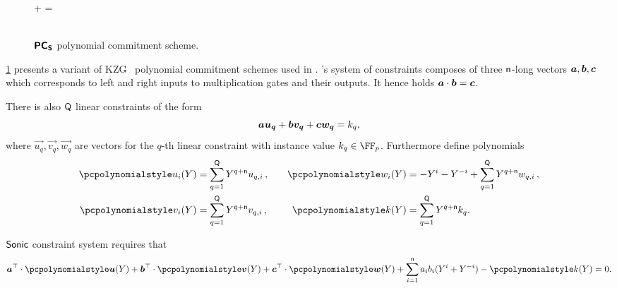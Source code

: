 \begin{figure}[h!]
\begin{pcvstack}
\begin{pchstack}
 			\pchspace

       {
         \pcif {} \bullet \gtwo{\alpha \chi} +  \bullet \gtwo{\alpha} = \\ [\myskip] \pcind {}
         \bullet \gtwo{\chi^{- \dconst + \maxconst}} \pcthen  {}\\
         [\myskip]
           }
 		\end{pchstack}
 	\end{pcvstack}

 	\caption{$\bm{\mathsf{PC}}_{\bm{\mathsf{S}}}$ polynomial commitment scheme.}
 	\label{fig:pcoms}
 \end{figure}



\label{sec:sonic_constraint_system}
\cref{fig:pcoms} presents a variant of KZG~\cite{AC:KatZavGol10} polynomial commitment schemes
used in \sonic{}. \sonic's system of constraints composes of three $\mathsf{n}$-long vectors
$\va, \vb, \vc$ which corresponds to left and right inputs to multiplication
gates and their outputs. It hence holds $\va \cdot \vb = \vc$.

There is also $\mathsf{Q}$ linear constraints of the form
\[
  \va \vec{u_q} + \vb \vec{v_q} + \vc \vec{w_q} = k_q,
\]
where $\vec{u_q}, \vec{v_q}, \vec{w_q}$ are vectors for the $q$-th linear
constraint with instance value $k_q \in \FF_p$. Furthermore define polynomials
\begin{equation}
  \begin{split}
    \p{u_i}(Y) & = \sum_{q = 1}^\linconstr Y^{q + \multconstr} u_{q, i}\,,\\
    \p{v_i}(Y) & = \sum_{q = 1}^\linconstr Y^{q + \multconstr} v_{q, i}\,,\\
  \end{split}
  \qquad
  \begin{split}
    \p{w_i}(Y) & = -Y^i - Y^{-i} + \sum_{q = 1}^\linconstr Y^{q +
      \multconstr} w_{q, i}\,,\\
    \p{k}(Y) & = \sum_{q = 1}^\linconstr Y^{q + \multconstr} k_{q}.
  \end{split}
\end{equation}

${\textnormal{\textsf{Sonic}}}$ constraint system requires that
\begin{align}
  \label{eq:sonic_constraint}
  \vec{a}^\top \cdot \vec{\p{u}} (Y) + \vec{b}^\top \cdot \vec{\p{v}} (Y) +
  \vec{c}^\top \cdot \vec{\p{w}} (Y) + \sum_{i = 1}^{\multconstr} a_i b_i (Y^i +
  Y^{-i}) - \p{k} (Y) = 0.
\end{align}

